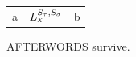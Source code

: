 \documentclass{article}
\begin{document}
\begin{tabular}{|r|p{1cm}|c|}
a & $L_{\scaleobj{.7}{X}}^{S_\tau, S_\sigma}$ & b \\
\end{tabular}
AFTERWORDS survive.
\end{document}
